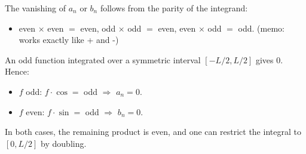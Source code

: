 \begin{remark}
The vanishing of $a_n$ or $b_n$ follows from the parity of the integrand:
\begin{itemize}
  \item even $\times$ even $=$ even, \quad odd $\times$ odd $=$ even, \quad even $\times$ odd $=$ odd.  (memo: works exactly like + and -)
\end{itemize}
An odd function integrated over a symmetric interval $[-L/2, L/2]$ gives $0$. Hence:
\begin{itemize}
  \item $f$ odd: $f \cdot \cos = $ odd $\Rightarrow$ $a_n = 0$.
  \item $f$ even: $f \cdot \sin = $ odd $\Rightarrow$ $b_n = 0$.
\end{itemize}
In both cases, the remaining product is even, and one can restrict the integral to $[0, L/2]$ by doubling.
\end{remark}
